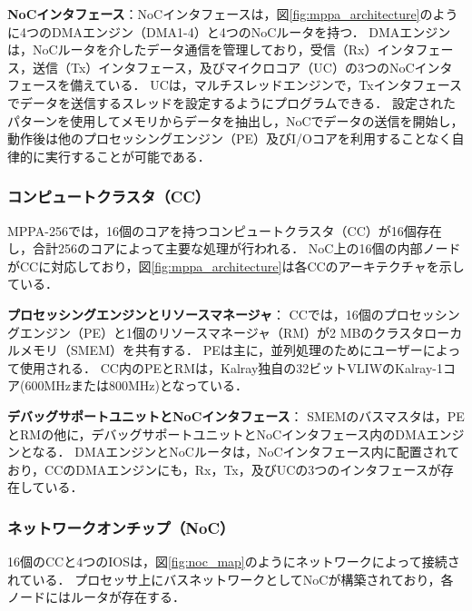 \documentclass[submit,techrep]{ipsj_v2/UTF8/ipsj}
\begin{document}
\textbf{NoCインタフェース}：NoCインタフェースは，図\ref{fig:mppa_architecture}のように4つのDMAエンジン（DMA1-4）と4つのNoCルータを持つ．
DMAエンジンは，NoCルータを介したデータ通信を管理しており，受信（Rx）インタフェース，送信（Tx）インタフェース，及びマイクロコア（UC）の3つのNoCインタフェースを備えている．
UCは，マルチスレッドエンジンで，Txインタフェースでデータを送信するスレッドを設定するようにプログラムできる．
設定されたパターンを使用してメモリからデータを抽出し，NoCでデータの送信を開始し，動作後は他のプロセッシングエンジン（PE）及びI/Oコアを利用することなく自律的に実行することが可能である．

\subsubsection{コンピュートクラスタ（CC）}
\label{sec:cc}
MPPA-256では，16個のコアを持つコンピュートクラスタ（CC）が16個存在し，合計256のコアによって主要な処理が行われる．
NoC上の16個の内部ノードがCCに対応しており，図\ref{fig:mppa_architecture}は各CCのアーキテクチャを示している．

\textbf{プロセッシングエンジンとリソースマネージャ}：
CCでは，16個のプロセッシングエンジン（PE）と1個のリソースマネージャ（RM）が2 MBのクラスタローカルメモリ（SMEM）を共有する．
PEは主に，並列処理のためにユーザーによって使用される．
CC内のPEとRMは，Kalray独自の32ビットVLIWのKalray-1コア(600MHzまたは800MHz)となっている．

\textbf{デバッグサポートユニットとNoCインタフェース}：
SMEMのバスマスタは，PEとRMの他に，デバッグサポートユニットとNoCインタフェース内のDMAエンジンとなる．
DMAエンジンとNoCルータは，NoCインタフェース内に配置されており，CCのDMAエンジンにも，Rx，Tx，及びUCの3つのインタフェースが存在している．

\subsubsection{ネットワークオンチップ（NoC）}
\label{sec:noc}
16個のCCと4つのIOSは，図\ref{fig:noc_map}のようにネットワークによって接続されている．
プロセッサ上にバスネットワークとしてNoCが構築されており，各ノードにはルータが存在する．
\end{document}
